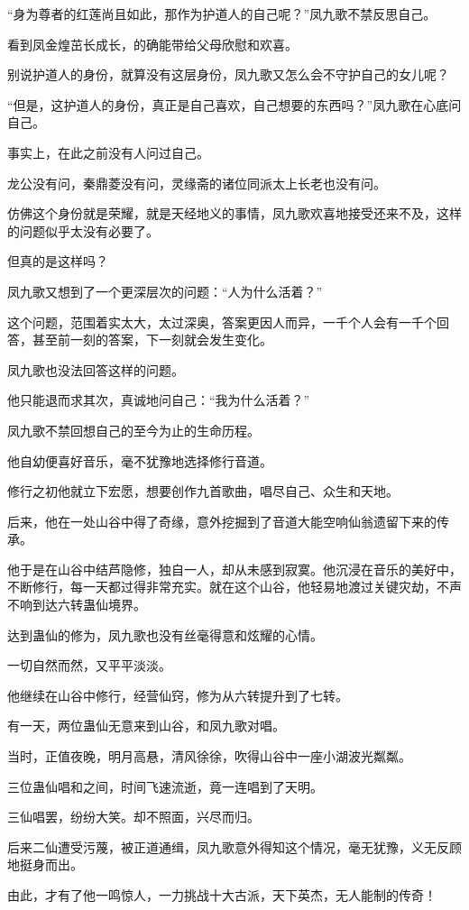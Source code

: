 \begin{this_body}
“身为尊者的红莲尚且如此，那作为护道人的自己呢？”凤九歌不禁反思自己。

看到凤金煌茁长成长，的确能带给父母欣慰和欢喜。

别说护道人的身份，就算没有这层身份，凤九歌又怎么会不守护自己的女儿呢？

“但是，这护道人的身份，真正是自己喜欢，自己想要的东西吗？”凤九歌在心底问自己。

事实上，在此之前没有人问过自己。

龙公没有问，秦鼎菱没有问，灵缘斋的诸位同派太上长老也没有问。

仿佛这个身份就是荣耀，就是天经地义的事情，凤九歌欢喜地接受还来不及，这样的问题似乎太没有必要了。

但真的是这样吗？

凤九歌又想到了一个更深层次的问题：“人为什么活着？”

这个问题，范围着实太大，太过深奥，答案更因人而异，一千个人会有一千个回答，甚至前一刻的答案，下一刻就会发生变化。

凤九歌也没法回答这样的问题。

他只能退而求其次，真诚地问自己：“我为什么活着？”

凤九歌不禁回想自己的至今为止的生命历程。

他自幼便喜好音乐，毫不犹豫地选择修行音道。

修行之初他就立下宏愿，想要创作九首歌曲，唱尽自己、众生和天地。

后来，他在一处山谷中得了奇缘，意外挖掘到了音道大能空响仙翁遗留下来的传承。

他于是在山谷中结芦隐修，独自一人，却从未感到寂寞。他沉浸在音乐的美好中，不断修行，每一天都过得非常充实。就在这个山谷，他轻易地渡过关键灾劫，不声不响到达六转蛊仙境界。

达到蛊仙的修为，凤九歌也没有丝毫得意和炫耀的心情。

一切自然而然，又平平淡淡。

他继续在山谷中修行，经营仙窍，修为从六转提升到了七转。

有一天，两位蛊仙无意来到山谷，和凤九歌对唱。

当时，正值夜晚，明月高悬，清风徐徐，吹得山谷中一座小湖波光粼粼。

三位蛊仙唱和之间，时间飞速流逝，竟一连唱到了天明。

三仙唱罢，纷纷大笑。却不照面，兴尽而归。

后来二仙遭受污蔑，被正道通缉，凤九歌意外得知这个情况，毫无犹豫，义无反顾地挺身而出。

由此，才有了他一鸣惊人，一力挑战十大古派，天下英杰，无人能制的传奇！


\end{this_body}
